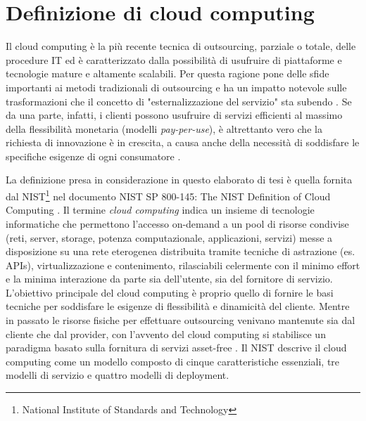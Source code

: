 \documentclass[../main.tex]{subfiles}
\begin{document}
\section{Definizione di cloud computing}
Il cloud computing è la più recente tecnica di outsourcing, parziale o totale, delle procedure IT ed è caratterizzato dalla possibilità di usufruire di piattaforme e tecnologie mature e altamente scalabili.
Per questa ragione pone delle sfide importanti ai metodi tradizionali di outsourcing e ha un impatto notevole sulle trasformazioni che il concetto di "esternalizzazione del servizio" sta subendo \cite{OutsourcingCloud}.
Se da una parte, infatti, i clienti possono usufruire di servizi efficienti al massimo della flessibilità monetaria (modelli \textit{pay-per-use}), è altrettanto vero che la richiesta di innovazione è in crescita, a causa anche della necessità di soddisfare le specifiche esigenze di ogni consumatore \cite{OutsourcingCloud2}.

La definizione presa in considerazione in questo elaborato di tesi è quella fornita dal NIST\footnote{National Institute of Standards and Technology} nel documento NIST SP 800-145: The NIST Definition of Cloud Computing \cite{NISTCloud}.
Il termine \textit{cloud computing} indica un insieme di tecnologie informatiche che permettono l'accesso on-demand a un pool di risorse condivise (reti, server, storage, potenza computazionale, applicazioni, servizi) messe a disposizione su una rete eterogenea distribuita tramite tecniche di astrazione (es. APIs), virtualizzazione e contenimento, rilasciabili celermente con il minimo effort e la minima interazione da parte sia dell'utente, sia del fornitore di servizio. %
L'obiettivo principale del cloud computing è proprio quello di fornire le basi tecniche per soddisfare le esigenze di flessibilità e dinamicità del cliente.
Mentre in passato le risorse fisiche per effettuare outsourcing venivano mantenute sia dal cliente che dal provider, con l'avvento del cloud computing si stabilisce un paradigma basato sulla fornitura di servizi asset-free \cite{OutsourcingCloud2}.
Il NIST \cite{NISTCloud} descrive il cloud computing come un modello composto di cinque caratteristiche essenziali, tre modelli di servizio e quattro modelli di deployment.
\end{document}
